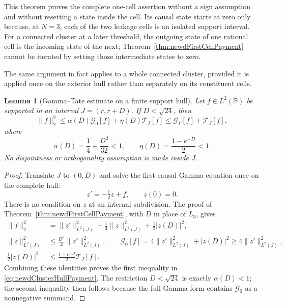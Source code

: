 \documentclass[11pt]{amsart}
\newtheorem{lemma}[theorem]{Lemma}
\theoremstyle{definition}
\theoremstyle{remark}
\newcommand{\R}{\mathbb R}
\begin{document}
This theorem proves the complete one-cell assertion without a sign
assumption and without resetting a state inside the cell.  Its causal state
starts at zero only because, at $N=3$, each of the two leakage cells is an
isolated support interval.  For a connected cluster at a later
threshold, the outgoing state of one rational cell is the incoming state of
the next; Theorem~\ref{thm:newdFirstCellPayment} cannot be iterated by
setting those intermediate states to zero.

The same argument in fact applies to a whole connected cluster, provided it
is applied once on the exterior hull rather than separately on its
constituent cells.

\begin{lemma}[Gamma--Tate estimate on a finite support hull]
\label{lem:newdClusterHull}
Let $f\in L^2(\R)$ be supported in an interval $J=(r,r+D)$.  If
$D<\sqrt{24}$, then
\begin{equation}\label{eq:newdClusterHullPayment}
 \|f\|_2^2
 \leq \alpha(D)\mathcal G_0[f]
       +\eta(D)\mathcal T_J[f]
 \leq \mathcal G_\Gamma[f]+\mathcal T_J[f],
\end{equation}
where
\begin{equation}\label{eq:newdClusterHullConstants}
 \alpha(D)=\frac14+\frac{D^2}{32}<1,
 \qquad
 \eta(D)=\frac{1-e^{-D}}2<1.
\end{equation}
No disjointness or orthogonality assumption is made inside $J$.
\end{lemma}

\begin{proof}
Translate $J$ to $(0,D)$ and solve the first causal Gamma equation once on
the complete hull:
\[
 z'=-\tfrac12z+f,
 \qquad z(0)=0.
\]
There is no condition on $z$ at an internal subdivision.  The proof of
Theorem~\ref{thm:newdFirstCellPayment}, with $D$ in place of $L_3$, gives
\begin{align*}
 \|f\|_2^2
 &=\|z'\|_{L^2(J)}^2+\tfrac14\|z\|_{L^2(J)}^2+\tfrac12|z(D)|^2,\\
 \|z\|_{L^2(J)}^2&\leq\tfrac{D^2}{2}\|z'\|_{L^2(J)}^2,
 \qquad
 \mathcal G_0[f]=4\|z'\|_{L^2(J)}^2+|z(D)|^2\geq4\|z'\|_{L^2(J)}^2,\\
 \tfrac12|z(D)|^2
 &\leq\tfrac{1-e^{-D}}2\mathcal T_J[f].
\end{align*}
Combining these identities proves the first inequality in
\eqref{eq:newdClusterHullPayment}.  The restriction $D<\sqrt{24}$ is
exactly $\alpha(D)<1$; the second inequality then follows because the full
Gamma form contains $\mathcal G_0$ as a nonnegative summand.
\end{proof}
\end{document}

